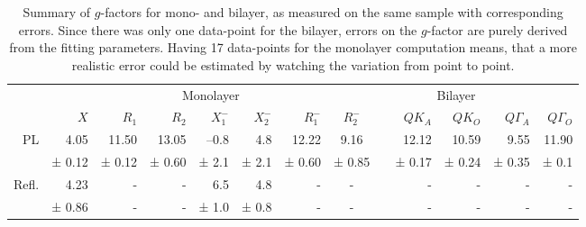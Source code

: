 \begin{table}[t]
	\centering
	\begin{tabular}{@{}rrrrrrrcrrrrr@{}}
		\toprule
	& \multicolumn{7}{c}{Monolayer} & \multicolumn{4}{c}{Bilayer}\\
	\cmidrule{2-8} \cmidrule{10-13}
	 & $X$ & $R_1$ & $R_2$ & $X^-_1$ & $X^-_2$ & $R^-_1$ & $R^-_2$ && $QK_A$ & $QK_O$ & $Q\Gamma_A$ & $Q\Gamma_O$\\ \midrule
	PL & 4.05& 11.50& 13.05 & --0.8& 4.8 & 12.22  & 9.16 && 12.12 & 10.59 & 9.55  & 11.90  \\
	& ± 0.12 &  ± 0.12 & ± 0.60 &  ± 2.1 &  ± 2.1 & ± 0.60  & ± 0.85 &&  ± 0.17 & ± 0.24 & ± 0.35 & ± 0.1 \\
	Refl. & 4.23 & - & - & 6.5 & 4.8 & - & - && - & - & - & - \\
	& ± 0.86 & - & - & ± 1.0 & ± 0.8 & - & - && - & - & - & - \\ \bottomrule

	\end{tabular}
	\caption{Summary of $g$-factors for \wse mono- and bilayer, as measured on the same sample with corresponding errors. Since there was only one data-point for the bilayer, errors on the $g$-factor are purely derived from the fitting parameters. Having 17 data-points for the monolayer computation means, that a more realistic error could be estimated by watching the variation from point to point.}\label{horsepoop}
\end{table}

